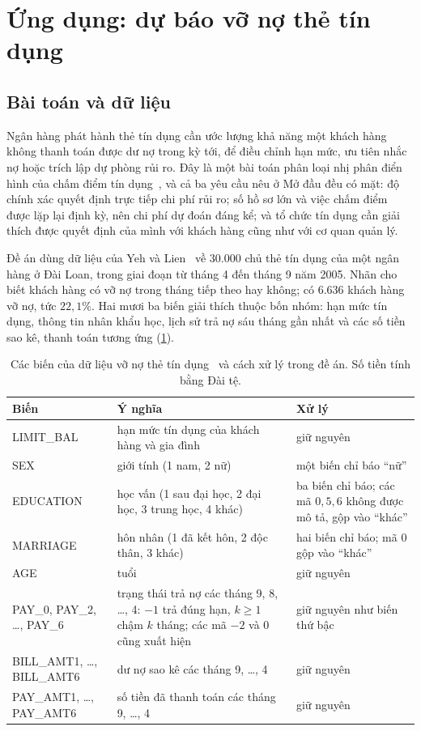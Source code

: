\section{Ứng dụng: dự báo vỡ nợ thẻ tín dụng}\label{sec:application}

\subsection{Bài toán và dữ liệu}

Ngân hàng phát hành thẻ tín dụng cần ước lượng khả năng một khách hàng không thanh toán được dư nợ trong kỳ tới, để điều chỉnh hạn mức, ưu tiên nhắc nợ hoặc trích lập dự phòng rủi ro. Đây là một bài toán phân loại nhị phân điển hình của chấm điểm tín dụng~\cite{thomas2002}, và cả ba yêu cầu nêu ở Mở đầu đều có mặt: độ chính xác quyết định trực tiếp chi phí rủi ro; số hồ sơ lớn và việc chấm điểm được lặp lại định kỳ, nên chi phí dự đoán đáng kể; và tổ chức tín dụng cần giải thích được quyết định của mình với khách hàng cũng như với cơ quan quản lý.

Đề án dùng dữ liệu của Yeh và Lien~\cite{yeh2009} về $30.000$ chủ thẻ tín dụng của một ngân hàng ở Đài Loan, trong giai đoạn từ tháng 4 đến tháng 9 năm 2005. Nhãn cho biết khách hàng có vỡ nợ trong tháng tiếp theo hay không; có $6.636$ khách hàng vỡ nợ, tức $22{,}1\%$. Hai mươi ba biến giải thích thuộc bốn nhóm: hạn mức tín dụng, thông tin nhân khẩu học, lịch sử trả nợ sáu tháng gần nhất và các số tiền sao kê, thanh toán tương ứng (\cref{tab:credit-vars}).

\begin{table}[t]
\centering
\caption[Các biến của dữ liệu vỡ nợ thẻ tín dụng]{Các biến của dữ liệu vỡ nợ thẻ tín dụng~\cite{yeh2009} và cách xử lý trong đề án. Số tiền tính bằng Đài tệ.}
\label{tab:credit-vars}
\small
\renewcommand{\arraystretch}{1.2}
\begin{tabularx}{\linewidth}{@{}l X X@{}}
\toprule
\textbf{Biến} & \textbf{Ý nghĩa} & \textbf{Xử lý}\\
\midrule
LIMIT\_BAL & hạn mức tín dụng của khách hàng và gia đình & giữ nguyên\\
SEX & giới tính (1 nam, 2 nữ) & một biến chỉ báo “nữ”\\
EDUCATION & học vấn (1 sau đại học, 2 đại học, 3 trung học, 4 khác) & ba biến chỉ báo; các mã $0,5,6$ không được mô tả, gộp vào “khác”\\
MARRIAGE & hôn nhân (1 đã kết hôn, 2 độc thân, 3 khác) & hai biến chỉ báo; mã $0$ gộp vào “khác”\\
AGE & tuổi & giữ nguyên\\
PAY\_0, PAY\_2, \dots, PAY\_6 & trạng thái trả nợ các tháng 9, 8, \dots, 4: $-1$ trả đúng hạn, $k\ge1$ chậm $k$ tháng; các mã $-2$ và $0$ cũng xuất hiện & giữ nguyên như biến thứ bậc\\
BILL\_AMT1, \dots, BILL\_AMT6 & dư nợ sao kê các tháng 9, \dots, 4 & giữ nguyên\\
PAY\_AMT1, \dots, PAY\_AMT6 & số tiền đã thanh toán các tháng 9, \dots, 4 & giữ nguyên\\
\bottomrule
\end{tabularx}
\end{table}

